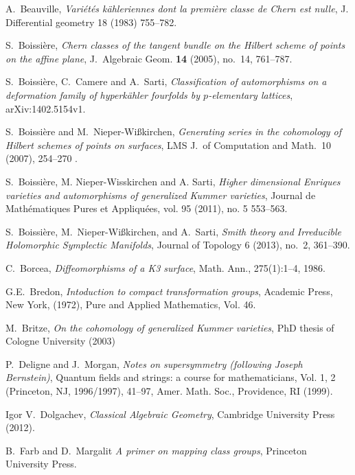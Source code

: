 
\begin{thebibliography}{10}

A.~Beauville, \emph{Vari\'et\'es k\"ahleriennes dont la premi\`ere classe de Chern est nulle}, 
  J. Differential geometry 18 (1983) 755--782.

S.~Boissi\`ere, \emph{Chern classes of the tangent bundle on the Hilbert scheme of points
  on the affine plane}, J.~Algebraic Geom. \textbf{14} (2005), no.~14, 761--787.

S.~Boissi\`ere, C.~Camere and A.~Sarti, \emph{Classification of automorphisms on a deformation family of hyperk\"ahler
fourfolds by $p$-elementary lattices}, arXiv:1402.5154v1.

S.~Boissi\`ere and M.~Nieper-Wi{\ss}kirchen, \emph{Generating series in the cohomology 
  of Hilbert schemes of points on surfaces}, LMS J.~of Computation and Math.~10 (2007), 254--270 .

S.~Boissi\`ere, M. Nieper-Wisskirchen and A. Sarti, 
\emph{Higher dimensional Enriques varieties and automorphisms of generalized Kummer varieties},
Journal de Math\'ematiques Pures et Appliqu\'ees,
vol. 95 (2011), no. 5 553--563.

S.~Boissi\`ere, M.~Nieper-Wi{\ss}kirchen, and A.~Sarti, \emph{Smith theory and 
  Irreducible Holomorphic Symplectic Manifolds}, Journal of Topology 6 (2013), no.~2, 361--390.

C.~Borcea,
\emph{Diffeomorphisms of a K3 surface},
Math. Ann., 275(1):1--4, 1986.

G.E.~Bredon,
\newblock \emph{Intoduction to compact transformation groups},
Academic Press, New York,
(1972), Pure and Applied Mathematics, Vol. 46.

M.~Britze, \emph{On the cohomology of generalized Kummer varieties}, PhD thesis of Cologne University (2003) 

P.~Deligne and J.~Morgan, \emph{Notes on supersymmetry (following Joseph Bernstein)}, Quantum
fields and strings: a course for mathematicians, Vol. 1, 2 (Princeton, NJ, 1996/1997), 41--97,
Amer. Math. Soc., Providence, RI (1999).

Igor V.~Dolgachev, \emph{Classical Algebraic Geometry}, 
  Cambridge University Press (2012).

B.~Farb and D.~Margalit \emph{A primer on mapping class groups}, Princeton University Press.


\end{thebibliography}
